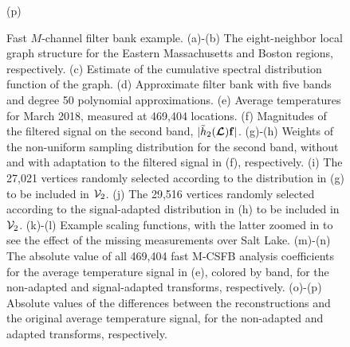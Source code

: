 \documentclass[journal, 10pt]{IEEEtran}
\begin{document}
\begin{figure}[tb]
\begin{minipage}[m]{0.24\linewidth}
\centerline{\small{(p)}}
\end{minipage}
\caption{Fast $M$-channel filter bank example. (a)-(b) The eight-neighbor local graph structure for the Eastern Massachusetts and Boston regions, respectively. (c) Estimate of the cumulative spectral distribution function of the graph. (d) Approximate filter bank with five bands and degree 50 polynomial approximations. (e) Average temperatures for March 2018, measured at 469,404 locations. (f) Magnitudes of the filtered signal on the second band, $|\tilde{h}_2(\boldsymbol{\mathcal{L}}){\bf f}|$. (g)-(h) Weights of the non-uniform sampling distribution for the second band, without and with adaptation to the filtered signal in (f), respectively. (i) The 27,021 vertices randomly selected according to the distribution in (g) to be included in ${\mathcal{V}}_2$. (j) The 29,516 vertices randomly selected according to the signal-adapted distribution in (h) to be included in ${\mathcal{V}}_2$. (k)-(l) Example scaling functions, with the latter zoomed in to see the effect of the missing measurements over Salt Lake. (m)-(n) The absolute value of all 469,404 fast M-CSFB analysis coefficients for the average temperature signal in (e), colored by band, for the non-adapted and signal-adapted transforms, respectively. (o)-(p) Absolute values of the differences between the reconstructions and the original average temperature signal, %
for the non-adapted and adapted transforms, respectively.} \label{Fig:temperature}
\end{figure}
\end{document}
